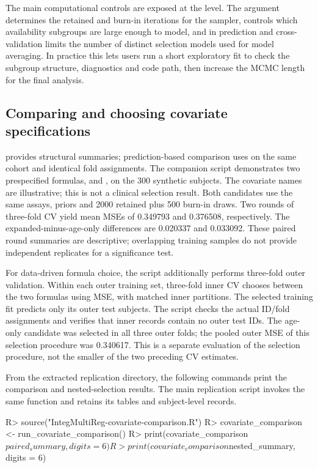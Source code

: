 \documentclass[article]{jss}
\begin{document}
The main computational controls are exposed at the  level.  The
argument  determines the retained and burn-in iterations for
the sampler,  controls which availability subgroups are large enough
to model, and  in prediction and cross-validation limits the
number of distinct selection models used for model averaging.  In
practice this lets users run a short exploratory fit to check the subgroup
structure, diagnostics and code path, then increase the MCMC length for the
final analysis.


\subsection{Comparing and choosing covariate specifications}\label{sec:covariate-comparison}

 provides structural summaries; prediction-based comparison
uses  on the same cohort and identical fold assignments.
The companion script demonstrates two prespecified formulas,
 and
, on the 300 synthetic subjects.
The covariate names are illustrative; this is not a clinical selection result.
Both candidates use the same assays, priors and 2000 retained plus 500 burn-in
draws. Two rounds of three-fold CV yield mean MSEs of 0.349793 and 0.376508,
respectively. The expanded-minus-age-only differences are 0.020337 and 0.033092.
These paired round summaries are descriptive; overlapping training samples do
not provide independent replicates for a significance test.

For data-driven formula choice, the script additionally performs three-fold
outer validation. Within each outer training set, three-fold inner CV chooses
between the two formulas using MSE, with matched inner partitions. The selected
training fit predicts only its outer test subjects. The script checks the actual
ID/fold assignments and verifies that inner records contain no outer test IDs.
The age-only candidate was selected in all three outer folds; the pooled outer
MSE of this selection procedure was 0.340617. This is a separate evaluation of
the selection procedure, not the smaller of the two preceding CV estimates.

From the extracted replication directory, the following commands print the
comparison and nested-selection results. The main replication script invokes
the same function and retains its tables and subject-level records.
\begin{CodeInput}
R> source("IntegMultiReg-covariate-comparison.R")
R> covariate_comparison <- run_covariate_comparison()
R> print(covariate_comparison$paired_summary, digits = 6)
R> print(covariate_comparison$nested_summary, digits = 6)
\end{CodeInput}
\end{document}
